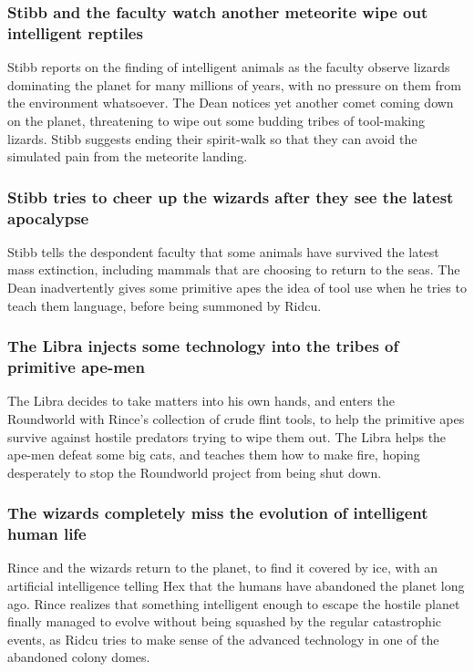 \subsubsection{\Gls{Stibb} and the faculty watch another meteorite wipe out intelligent reptiles}
\Gls{Stibb} reports on the finding of intelligent animals as the faculty observe lizards dominating
the planet for many millions of years, with no pressure on them from the environment whatsoever.
The \Gls{Dean} notices yet another comet coming down on the planet, threatening to wipe out some
budding tribes of tool-making lizards. \Gls{Stibb} suggests ending their spirit-walk so that they
can avoid the simulated pain from the meteorite landing.

\subsubsection{\Gls{Stibb} tries to cheer up the wizards after they see the latest apocalypse}
\Gls{Stibb} tells the despondent faculty that some animals have survived the latest mass extinction,
including mammals that are choosing to return to the seas. The \Gls{Dean} inadvertently gives some 
primitive apes the idea of tool use when he tries to teach them language, before being summoned 
by \Gls{Ridcu}.

\subsubsection{The \Gls{Libra} injects some technology into the tribes of primitive ape-men}
The \Gls{Libra} decides to take matters into his own hands, and enters the Roundworld with 
\Gls{Rince}'s collection of crude flint tools, to help the primitive apes survive against hostile 
predators trying to wipe them out. The \Gls{Libra} helps the ape-men defeat some big cats, and 
teaches them how to make fire, hoping desperately to stop the Roundworld project from being shut 
down.

\subsubsection{The wizards completely miss the evolution of intelligent human life}
\Gls{Rince} and the wizards return to the planet, to find it covered by ice, with an artificial 
intelligence telling \Gls{Hex} that the humans have abandoned the planet long ago. \Gls{Rince} 
realizes that something intelligent enough to escape the hostile planet finally managed to evolve 
without being squashed by the regular catastrophic events, as \Gls{Ridcu} tries to make sense of 
the advanced technology in one of the abandoned colony domes.

